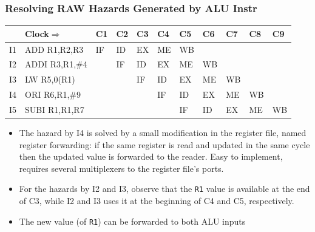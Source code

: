 \documentclass{beamer}
\renewcommand{\emph}[1]{\textcolor{structure}{#1}}
\newcommand{\emp}[1]{\textcolor{DikuRed}{ #1}}
\begin{document}
\begin{frame}[fragile,t]
\frametitle{Resolving RAW Hazards Generated by ALU Instr}

\bigskip

\begin{scriptsize}
\begin{tabular}{lllllllllll}
\hline
   & Clock$\Rightarrow$ & C1 & C2 & C3 & C4 & C5 & C6 & C7 & C8 & C9 \\\hline
I1 & ADD  R1,R2,R3      & IF & ID & EX & \emp{ME} & WB &    &    &    &    \\
I2 & ADDI R3,R1,\#4     &    & IF & ID & \emph{EX} & ME & WB &    &    &    \\
I3 & LW   R5,0(R1)      &    &    & IF & ID & \emph{EX} & ME & WB &    &    \\
I4 & ORI  R6,R1,\#9     &    &    &    & IF & ID & EX & ME & WB &    \\
I5 & SUBI R1,R1,R7      &    &    &    &    & IF & ID & EX & ME & WB \\\hline
\end{tabular}
\end{scriptsize} 

\bigskip

\begin{scriptsize}
\begin{itemize}
\item The hazard by I4 is solved by a small modification in the \emp{register file},
        named \emph{register forwarding}: if the same register is read and 
        updated in the same cycle then the updated value is forwarded to the
        reader. Easy to implement, requires several multiplexers to the 
        register file's ports.\smallskip
        
\item For the hazards by I2 and I3, observe that the {\tt R1} value
        is available at the end of C3, while I2 and I3 uses it at the
        beginning of C4 and C5, respectively.\smallskip

\item The new value (of {\tt R1}) can be \emph{forwarded to both ALU inputs}
\begin{itemize}
\end{itemize}
\end{itemize}
\end{scriptsize}

\end{frame}
\end{document}
